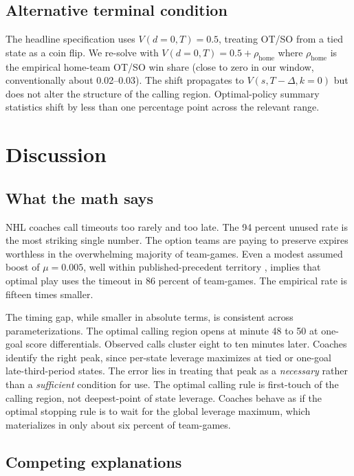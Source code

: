 \documentclass[11pt]{article}
\begin{document}
\subsection{Alternative terminal condition}

The headline specification uses $V(d=0, T) = 0.5$, treating OT/SO from a tied state as a coin flip. We re-solve with $V(d=0, T) = 0.5 + \rho_{\text{home}}$ where $\rho_{\text{home}}$ is the empirical home-team OT/SO win share (close to zero in our window, conventionally about 0.02--0.03). The shift propagates to $V(s, T-\Delta, k=0)$ but does not alter the structure of the calling region. Optimal-policy summary statistics shift by less than one percentage point across the relevant range.

\section{Discussion}\label{sec:discussion}

\subsection{What the math says}

NHL coaches call timeouts too rarely and too late. The 94 percent unused rate is the most striking single number. The option teams are paying to preserve expires worthless in the overwhelming majority of team-games. Even a modest assumed boost of $\mu = 0.005$, well within published-precedent territory \citep{Ferer2020}, implies that optimal play uses the timeout in 86 percent of team-games. The empirical rate is fifteen times smaller.

The timing gap, while smaller in absolute terms, is consistent across parameterizations. The optimal calling region opens at minute 48 to 50 at one-goal score differentials. Observed calls cluster eight to ten minutes later. Coaches identify the right peak, since per-state leverage maximizes at tied or one-goal late-third-period states. The error lies in treating that peak as a \emph{necessary} rather than a \emph{sufficient} condition for use. The optimal calling rule is first-touch of the calling region, not deepest-point of state leverage. Coaches behave as if the optimal stopping rule is to wait for the global leverage maximum, which materializes in only about six percent of team-games.

\subsection{Competing explanations}
\end{document}
